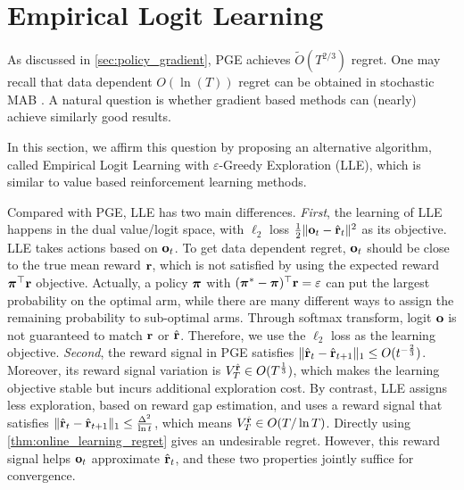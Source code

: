 \section{Empirical Logit Learning}
\label{sec:logit_learning}

As discussed in \cref{sec:policy_gradient}, PGE achieves $\tilde{O}(T^{2/3})$ regret. One may recall that data dependent $O(\ln(T))$ regret can be obtained in stochastic MAB \citep{bubeck2012regret}. A natural question is whether gradient based methods can (nearly) achieve similarly good results.

In this section, we affirm this question by proposing an alternative algorithm, called Empirical Logit Learning with $\varepsilon$-Greedy Exploration (LLE), which is similar to value based reinforcement learning methods.

Compared with PGE, LLE has two main differences. \textit{First}, the learning of LLE happens in the dual value/logit space, with $\ell_2$ loss $\frac{1}{2} \| {\mathbf{o}}_t - \hat{{\mathbf{r}}}_t \|^2$ as its objective. LLE takes actions based on ${\mathbf{o}}_t$. To get data dependent regret, ${\mathbf{o}}_t$ should be close to the true mean reward ${\mathbf{r}}$, which is not satisfied by using the expected reward ${\boldsymbol{\pi}}^\top {\mathbf{r}}$ objective. Actually, a policy ${\boldsymbol{\pi}}$ with $({\boldsymbol{\pi}}^* - {\boldsymbol{\pi}})^\top {\mathbf{r}} = \varepsilon$ can put the largest probability on the optimal arm, while there are many different ways to assign the remaining probability to sub-optimal arms. Through softmax transform, logit ${\mathbf{o}}$ is not guaranteed to match ${\mathbf{r}}$ or $\hat{{\mathbf{r}}}$. Therefore, we use the $\ell_2$ loss as the learning objective. \textit{Second}, the reward signal in PGE satisfies $\| \hat{{\mathbf{r}}}_t  - \hat{{\mathbf{r}}}_{t+1} \|_1 \le O(t^{-\frac{2}{3}})$. Moreover, its reward signal variation is $V_T^{\hat{{\mathbf{r}}}} \in O(T^{\frac{1}{3}})$, which makes the learning objective stable but incurs additional exploration cost. By contrast, LLE assigns less exploration, based on reward gap estimation, and uses a reward signal that satisfies $\| \hat{{\mathbf{r}}}_t - \hat{{\mathbf{r}}}_{t+1} \|_1 \le \frac{\Delta^2}{\ln{t}}$, which means $V_T^{\hat{{\mathbf{r}}}} \in O(T/\ln{T})$. Directly using \cref{thm:online_learning_regret} gives an undesirable regret. However, this reward signal helps ${\mathbf{o}}_t$ approximate $\hat{{\mathbf{r}}}_t$, and these two properties jointly suffice for convergence.

